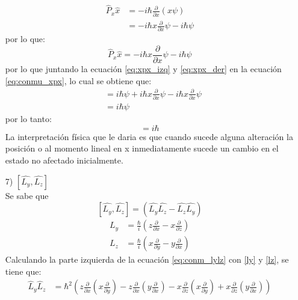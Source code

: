 \documentclass[12pt,letterpaper]{article}
\begin{document}
\begin{enumerate}
    \begin{align*}
        \hat{P}_x\hat{x} &= - i\hbar \frac{\partial}{\partial x} (x\psi)\\
        &= -i \hbar x \frac{\partial}{\partial x} \psi - i\hbar \psi
    \end{align*}
    por lo que:
    \begin{equation}
        \label{eq:xpx_der}
        \hat{P}_x\hat{x} = -i \hbar x \frac{\partial}{\partial x} \psi - i\hbar \psi
    \end{equation}
    por lo que juntando la ecuación \ref{eq:xpx_izq} y \ref{eq:xpx_der} en la ecuación \ref{eq:conmu_xpx}, lo cual se obtiene que:
    \begin{align*}
        [\hat{x},\hat{P}_x] &= i\hbar \psi + i \hbar x \frac{\partial}{\partial x} \psi -i \hbar x \frac{\partial}{\partial x} \psi\\
        &= i\hbar \psi
    \end{align*}
    por lo tanto:
    \begin{equation}
        [\hat{x},\hat{P}_x] = i\hbar
    \end{equation}
    La interpretación física que le daria es que cuando sucede alguna alteración la posición o al momento lineal en x inmediatamente sucede un cambio en el estado no afectado inicialmente.
    \item[7)] $[\hat{L_y},\hat{L_z}]$ \\
    Se sabe que 
    \begin{equation}
        \label{eq:conm_lylz}
        [\hat{L_y},\hat{L_z}]=(\hat{L_y}\hat{L_z}-\hat{L_z}\hat{L_y})
    \end{equation}
    \begin{align}
        \label{ly}
        L_y&= \frac{\hbar}{i} \left( z\frac{\partial}{\partial x}- x \frac{\partial}{\partial z}\right)\\
        L_z&= \frac{\hbar}{i} \left( x\frac{\partial}{\partial y}- y \frac{\partial}{\partial x}\right)
        \label{lz}
    \end{align}
    Calculando la parte izquierda de la ecuación \ref{eq:conm_lylz} con \ref{ly} y \ref{lz}, se tiene que:
    \begin{align*}
        \hat{L}_y\hat{L}_z&=\hbar^2 \left(z\frac{\partial}{\partial x} \left(x\frac{\partial}{\partial y}\right)-
        z\frac{\partial}{\partial x} \left(y\frac{\partial}{\partial x}\right)  -
        x\frac{\partial}{\partial z} \left(x\frac{\partial}{\partial y}\right) +
        x\frac{\partial}{\partial z} \left(y\frac{\partial}{\partial x}\right) \right)\\

\end{align*}
\end{enumerate}
\end{document}
